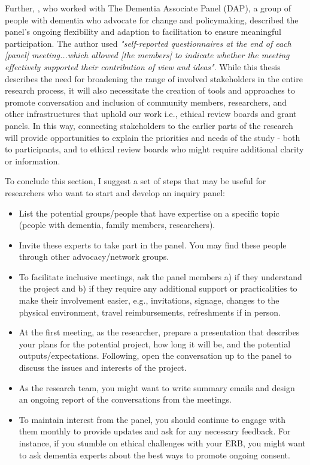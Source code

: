 Further, \cite{innes2021s}, who worked with The Dementia Associate Panel (DAP), a group of people with dementia who advocate for change and policymaking, described the panel's ongoing flexibility and adaption to facilitation to ensure meaningful participation. The author used \textit{"self-reported questionnaires at the end of each [panel] meeting...which allowed [the members] to indicate whether the meeting effectively supported their contribution of view and ideas"}. While this thesis describes the need for broadening the range of involved stakeholders in the entire research process, it will also necessitate the creation of tools and approaches to promote conversation and inclusion of community members, researchers, and other infrastructures that uphold our work i.e., ethical review boards and grant panels. In this way, connecting stakeholders to the earlier parts of the research will provide opportunities to explain the priorities and needs of the study - both to participants, and to ethical review boards who might require additional clarity or information.

To conclude this section, I suggest a set of steps that may be useful for researchers who want to start and develop an inquiry panel:

\begin{itemize}
    \item List the potential groups/people that have expertise on a specific topic (people with dementia, family members, researchers).
    \item Invite these experts to take part in the panel. You may find these people through other advocacy/network groups.
    \item To facilitate inclusive meetings, ask the panel members a) if they understand the project and b) if they require any additional support or practicalities to make their involvement easier, e.g., invitations, signage, changes to the physical environment, travel reimbursements, refreshments if in person.
    \item At the first meeting, as the researcher, prepare a presentation that describes your plans for the potential project, how long it will be, and the potential outputs/expectations. Following, open the conversation up to the panel to discuss the issues and interests of the project.
    \item As the research team, you might want to write summary emails and design an ongoing report of the conversations from the meetings. 
    \item To maintain interest from the panel, you should continue to engage with them monthly to provide updates and ask for any necessary feedback. For instance, if you stumble on ethical challenges with your ERB, you might want to ask dementia experts about the best ways to promote ongoing consent. 

\end{itemize}

